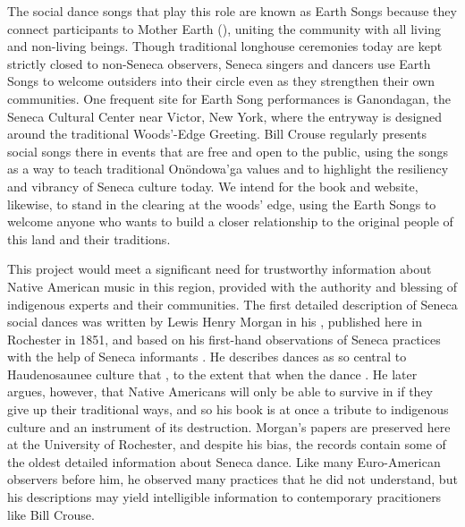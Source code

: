 \documentclass{neh}
\begin{document}
The social dance songs that play this role are known as Earth Songs because
they connect participants to Mother Earth (),
uniting the community with all living and non-living beings.
Though traditional longhouse ceremonies today are kept strictly closed to
non-Seneca observers, Seneca singers and dancers use Earth Songs to welcome
outsiders into their circle even as they strengthen their own communities.
One frequent site for Earth Song performances is Ganondagan, the Seneca
Cultural Center near Victor, New York, where the entryway is designed around
the traditional Woods'-Edge Greeting.
Bill Crouse regularly presents social songs there in events that are free and
open to the public, using the songs as a way to teach traditional Onöndowa'ga
values and to highlight the resiliency and vibrancy of Seneca culture today.
We intend for the book and website, likewise, to stand in the clearing at the
woods' edge, using the Earth Songs to welcome anyone who wants to build a
closer relationship to the original people of this land and their traditions.

This project would meet a significant need for trustworthy information about
Native American music in this region, provided with the authority and blessing
of indigenous experts and their communities.
The first detailed description of Seneca social dances was written by Lewis
Henry Morgan in his ,
published here in Rochester in 1851, and based on his first-hand observations
of Seneca practices with the help of Seneca informants
\Autocite{Morgan:League}.
He describes dances as so central to Haudenosaunee culture that , to the
extent that when the dance 
\Autocite[261, 263]{Morgan:League}.
He later argues, however, that Native Americans will only be able to survive
in  if they give up their traditional ways, and so his
book is at once a tribute to indigenous culture and an instrument of its
destruction.
Morgan's papers are preserved here at the University of Rochester, and despite
his bias, the records contain some of the oldest detailed information about
Seneca dance.
Like many Euro-American observers before him, he observed many practices that
he did not understand, but his descriptions may yield intelligible information
to contemporary pracitioners like Bill Crouse.
\end{document}
